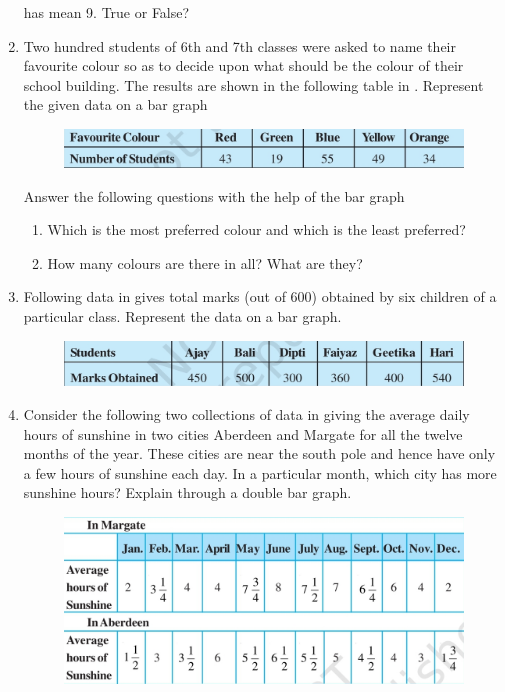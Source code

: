 \begin{enumerate}[label=\thesection.\arabic*, ref=\thesection.\theenumi,resume*]
has mean 9.  True or False?
\item Two hundred students of 6th and 7th classes were asked to name their favourite colour so as to decide upon what should be the colour of their school building. The results are shown in the following table
  in .
	 Represent the given data on a bar graph
	\begin{figure}[H]
  \centering
  \includegraphics[width=\columnwidth]{figs/bar.jpg}
  \caption{}
  \label{fig:bar}
\end{figure}
Answer the following questions with the help of the bar graph
	\begin{enumerate}
	\item Which is the most preferred colour and which is the least preferred? 
	\item How many colours are there in all? What are they?
	\end{enumerate}
\item Following data 
  in 
	gives total marks (out of 600) obtained by six children of a particular class. Represent the data on a bar graph.
	\begin{figure}[H]
  \centering
  \includegraphics[width=\columnwidth]{figs/bar1.jpg}
  \caption{}
  \label{fig:bar1}
\end{figure}
\item Consider the following two collections of data 
in
	giving the average daily hours of sunshine in two cities Aberdeen and Margate for all the twelve months of the year. These cities are near the south pole and hence have only a few hours of sunshine each day.
	In a particular month, which city has more sunshine hours?  Explain through a double bar graph.
	\begin{figure}[H]
  \centering
  \includegraphics[width=\columnwidth]{figs/bar2.jpg}

\end{figure}
\end{enumerate}

